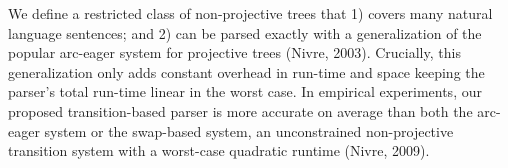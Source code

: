 We define a restricted class of non-projective trees that 1) covers many natural language sentences; and 2) can be parsed exactly with a generalization of the popular arc-eager system for projective trees (Nivre, 2003). Crucially, this generalization only adds constant overhead in run-time and space keeping the parser's total run-time linear in the worst case. In empirical experiments, our proposed transition-based parser is more accurate on average than both the arc-eager system or the swap-based system, an unconstrained non-projective transition system with a worst-case quadratic runtime (Nivre, 2009).
